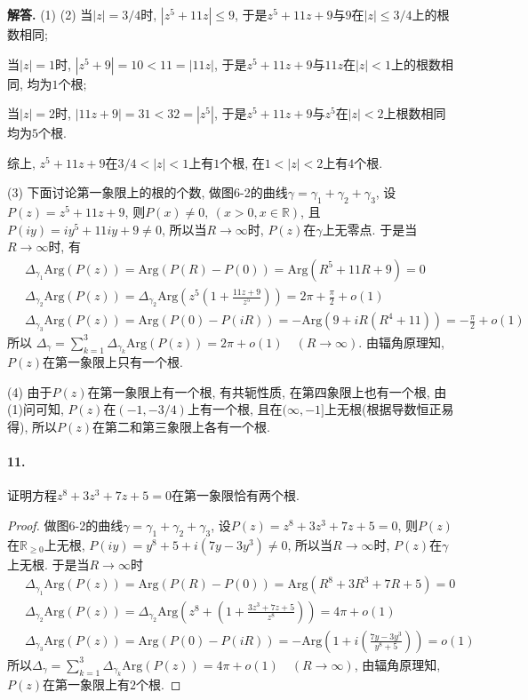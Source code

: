 \documentclass[12pt, a4paper, oneside]{ctexart}
\newenvironment{solution}{\par\noindent\textbf{解答. }}{\bigskip\par}
\let\leq=\leqslant %
\let\geq=\geqslant %
\def\arg{\text{Arg}}
\def\R{\mathbb{R}}      %
\begin{document}
\begin{solution}
    (1) (2) 当$|z| = 3/4$时, $|z^5+11z|\leq 9$, 于是$z^5+11z+9$与$9$在$|z| \leq 3/4$上的根数相同;
    
    当$|z| = 1$时, $|z^5+9|= 10 < 11 = |11z|$,  于是$z^5+11z+9$与$11z$在$|z| < 1$上的根数相同, 均为$1$个根;
    
    当$|z| = 2$时, $|11z+9|=31 < 32 = |z^5|$, 于是$z^5+11z+9$与$z^5$在$|z|<2$上根数相同均为$5$个根.

    综上, $z^5+11z+9$在$3/4<|z|<1$上有$1$个根, 在$1<|z|<2$上有$4$个根.

    (3) 下面讨论第一象限上的根的个数, 做图6-2的曲线$\gamma = \gamma_1+\gamma_2+\gamma_3$, 设$P(z) = z^5+11z+9$, 则$P(x)\neq 0,\ (x > 0, x\in\R)$, 且$P(iy) = iy^5+11iy+9\neq 0$, 所以当$R\to\infty$时, $P(z)$在$\gamma$上无零点. 于是当$R\to\infty$时, 有
    \begin{align*}
        &\ \Delta_{\gamma_1}\arg(P(z)) = \arg(P(R) - P(0)) = \arg(R^5+11R+9)= 0\\
        &\ \Delta_{\gamma_2}\arg(P(z)) = \Delta_{\gamma_2}\arg(z^5(1+\frac{11z+9}{z^5})) = 2\pi +\frac{\pi}{2}+o(1)\\
        &\ \Delta_{\gamma_3}\arg(P(z)) = \arg(P(0) - P(iR)) = -\arg(9+iR(R^4+11)) = -\frac{\pi}{2}+o(1)
    \end{align*}
    所以 $\Delta_{\gamma} = \sum_{k=1}^3\Delta_{\gamma_k}\arg(P(z)) = 2\pi+o(1)\quad(R\to\infty)$. 由辐角原理知, $P(z)$在第一象限上只有一个根.

    (4) 由于$P(z)$在第一象限上有一个根, 有共轭性质, 在第四象限上也有一个根, 由(1)问可知, $P(z)$在$(-1,-3/4)$上有一个根, 且在$(\infty, -1]$上无根(根据导数恒正易得), 所以$P(z)$在第二和第三象限上各有一个根.
\end{solution}
\paragraph{11.}证明方程$z^8+3z^3+7z+5=0$在第一象限恰有两个根.
\begin{proof}
    做图6-2的曲线$\gamma = \gamma_1+\gamma_2+\gamma_3$, 设$P(z) = z^8+3z^3+7z+5=0$, 则$P(z)$在$\R_{\geq 0}$上无根, $P(iy) = y^8+5+i(7y-3y^3)\neq 0$, 所以当$R\to\infty$时, $P(z)$在$\gamma$上无根. 于是当$R\to\infty$时
    \begin{align*}
        &\ \Delta_{\gamma_1}\arg(P(z)) = \arg(P(R) - P(0)) = \arg(R^8+3R^3+7R+5)= 0\\
        &\ \Delta_{\gamma_2}\arg(P(z)) = \Delta_{\gamma_2}\arg\left(z^8+\left(1+\frac{3z^3+7z+5}{z^8}\right)\right) = 4\pi+o(1)\\
        &\ \Delta_{\gamma_3}\arg(P(z)) = \arg(P(0) - P(iR)) = -\arg\left(1+i\left(\frac{7y-3y^3}{y^8+5}\right)\right) = o(1)
    \end{align*}
    所以$\Delta_\gamma = \sum_{k=1}^3\Delta_{\gamma_k}\arg(P(z)) = 4\pi +o(1)\quad(R\to\infty)$, 由辐角原理知, $P(z)$在第一象限上有$2$个根.
\end{proof}
\end{document}
